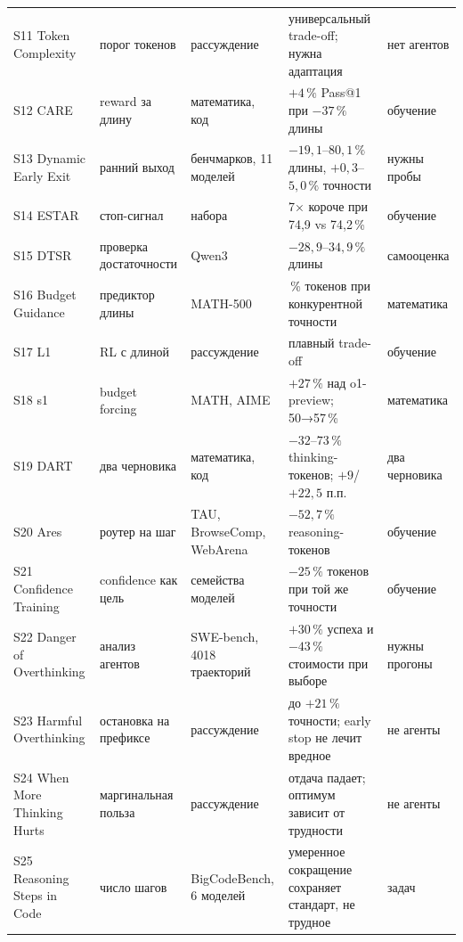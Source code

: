 \documentclass[11pt,a4paper]{article}
\begin{document}
{\begin{longtable}{@{}>{\raggedright\arraybackslash}p{2.6cm}>{\raggedright\arraybackslash}p{3.2cm}>{\raggedright\arraybackslash}p{3.2cm}>{\raggedright\arraybackslash}p{3.4cm}>{\raggedright\arraybackslash}p{3.0cm}@{}}
S11 Token Complexity \cite{lee2025wellllms} & порог токенов & рассуждение & универсальный trade-off; нужна адаптация & нет агентов \\
S12 CARE \cite{he2026thinkor} & reward за длину & математика, код & $+4\,\%$ Pass@1 при $-37\,\%$ длины & обучение \\
S13 Dynamic Early Exit \cite{yang2025dynamicearly} & ранний выход & 10 бенчмарков, 11 моделей & $-19{,}1$--$80{,}1\,\%$ длины, $+0{,}3$--$5{,}0\,\%$ точности & нужны пробы \\
S14 ESTAR \cite{wang2026estarearly} & стоп-сигнал & 4 набора & 3{,}7× короче при 74{,}9 vs 74{,}2\,\% & обучение \\
S15 DTSR \cite{xiang2026thinkingenough} & проверка достаточности & Qwen3 & $-28{,}9$--$34{,}9\,\%$ длины & самооценка \\
S16 Budget Guidance \cite{li2025steeringllm} & предиктор длины & MATH-500 & 63\,\% токенов при конкурентной точности & математика \\
S17 L1 \cite{aggarwal2025l1controlling} & RL с длиной & рассуждение & плавный trade-off & обучение \\
S18 s1 \cite{muennighoff2025s1simple} & budget forcing & MATH, AIME & $+27\,\%$ над o1-preview; 50→57\,\% & математика \\
S19 DART \cite{lee2026dartdraft} & два черновика & математика, код & $-32$--$73\,\%$ thinking-токенов; $+9$/$+22{,}5$ п.п. & два черновика \\
S20 Ares \cite{yang2026aresadaptive} & роутер на шаг & TAU, BrowseComp, WebArena & $-52{,}7\,\%$ reasoning-токенов & обучение \\
S21 Confidence Training \cite{hosseini2026learningstop} & confidence как цель & 4 семейства моделей & $-25\,\%$ токенов при той же точности & обучение \\
S22 Danger of Overthinking \cite{cuadron2025dangeroverthinking} & анализ агентов & SWE-bench, 4018 траекторий & $+30\,\%$ успеха и $-43\,\%$ стоимости при выборе & нужны прогоны \\
S23 Harmful Overthinking \cite{caldarella2026thinkingpast} & остановка на префиксе & рассуждение & до $+21\,\%$ точности; early stop не лечит вредное & не агенты \\
S24 When More Thinking Hurts \cite{zhou2026thinkinghurts} & маргинальная польза & рассуждение & отдача падает; оптимум зависит от трудности & не агенты \\
S25 Reasoning Steps in Code \cite{xue2025empiricalstudy} & число шагов & BigCodeBench, 6 моделей & умеренное сокращение сохраняет стандарт, не трудное & 100 задач \\

\end{longtable}}
\end{document}
